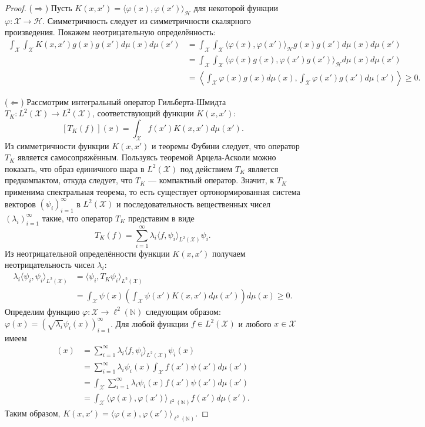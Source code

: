 \begin{proof}
($\Rightarrow$) Пусть $K(x, x') = \langle \varphi(x), \varphi(x') \rangle_\mathcal{H}$ для некоторой функции $\varphi \colon \mathcal{X} \to \mathcal{H}$. Симметричность следует из симметричности скалярного произведения. Покажем неотрицательную определённость:
\begin{align*}
    \int_\mathcal{X} \int_\mathcal{X} K(x, x') g(x) g(x') d\mu(x) d\mu(x') &= \int_\mathcal{X} \int_\mathcal{X} \langle \varphi(x), \varphi(x') \rangle_\mathcal{H} g(x) g(x') d\mu(x) d\mu(x') \\
    &= \int_\mathcal{X} \int_\mathcal{X} \langle \varphi(x) g(x), \varphi(x') g(x') \rangle_\mathcal{H} d\mu(x) d\mu(x') \\
    &= \left\langle \int_\mathcal{X} \varphi(x) g(x) d\mu(x), \int_\mathcal{X} \varphi(x') g(x') d\mu(x') \right\rangle \ge 0.
\end{align*}

($\Leftarrow$) Рассмотрим интегральный оператор Гильберта-Шмидта $T_K \colon L^2(\mathcal{X}) \to L^2(\mathcal{X})$, соответствующий функции $K(x, x')$:
\[ [T_K(f)](x) = \int_\mathcal{X} f(x') K(x, x') d\mu(x'). \]
Из симметричности функции $K(x, x')$ и теоремы Фубини следует, что оператор $T_K$ является самосопряжённым. Пользуясь теоремой Арцела-Асколи можно показать, что образ единичного шара в $L^2(\mathcal{X})$ под действием $T_K$ является предкомпактом, откуда следует, что $T_K$ --- компактный оператор. Значит, к $T_K$ применима спектральная теорема, то есть существует ортонормированная система векторов $(\psi_i)_{i=1} ^\infty$ в $L^2(\mathcal{X})$ и последовательность вещественных чисел $(\lambda_i)_{i=1}^\infty$ такие, что оператор $T_K$ представим в виде
\[ T_K(f) = \sum_{i=1}^\infty \lambda_i \langle f, \psi_i \rangle_{L^2(\mathcal{X})} \psi_i. \]
Из неотрицательной определённости функции $K(x, x')$ получаем неотрицательность чисел $\lambda_i$:
\begin{align*}
    \lambda_i \langle \psi_i, \psi_i \rangle_{L^2(\mathcal{X})} &= \langle \psi_i, T_K \psi_i \rangle_{L^2(\mathcal{X})} \\
    &= \int_\mathcal{X} \psi(x) \left( \int_\mathcal{X} \psi(x') K(x, x') d\mu(x') \right) d\mu(x) \ge 0.
\end{align*}
Определим функцию $\varphi \colon \mathcal{X} \to \ell^2(\mathbb{N})$ следующим образом: $\varphi(x) = (\sqrt{\lambda_i} \psi_i(x))_{i=1}^\infty$. Для любой функции $f \in L^2(\mathcal{X})$ и любого $x \in \mathcal{X}$ имеем
\begin{align*}
    [T_K(f)](x) &= \sum_{i=1}^\infty \lambda_i \langle f, \psi_i \rangle_{L^2(\mathcal{X})} \psi_i(x) \\
    &= \sum_{i=1}^\infty \lambda_i \psi_i(x) \int_\mathcal{X} f(x') \psi(x') d\mu(x') \\
    &= \int_\mathcal{X} \sum_{i=1}^\infty \lambda_i \psi_i(x) f(x') \psi(x') d\mu(x') \\
    &= \int_\mathcal{X} \langle \varphi(x), \varphi(x') \rangle_{\ell^2(\mathbb{N})} f(x') d\mu(x').
\end{align*}
Таким образом, $K(x, x') = \langle \varphi(x), \varphi(x') \rangle_{\ell^2(\mathbb{N})}$.
\end{proof}

